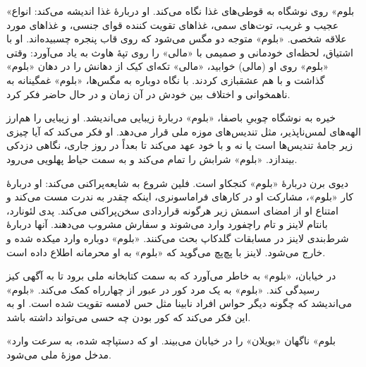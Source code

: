 \documentclass[12pt]{book}
\newcommand{\noun}[1]{«{#1}»}
\begin{document}
    \noun{بلوم} روی نوشگاه به قوطی‌های غذا نگاه می‌کند. او دربارۀ غذا اندیشه می‌کند: انواع عجیب و غریب، توت‌های سمی، غذاهای تقویت کننده قوای جنسی، و غذاهای مورد علاقه شخصی. \noun{بلوم} متوجه دو مگس می‌شود که روی قاب پنجره چسبیده‌اند. او با اشتیاق، لحظه‌ای خودمانی و صمیمی با \noun{مالی} را روی تپۀ هاوث به یاد می‌آورد: وقتی \noun{بلوم} روی او (مالی) خوابید، \noun{مالی} تکه‌ای کیک از دهانش را در دهان \noun{بلوم} گذاشت و با هم عشقبازی کردند. با نگاه دوباره به مگس‌ها، \noun{بلوم} غمگینانه به ناهمخوانی و اختلاف بین خودش در آن زمان و در حال حاضر فکر کرد.

    خیره به نوشگاه چوبیِ باصفا، \noun{بلوم} دربارۀ زیبایی می‌اندیشد. او زیبایی را هم‌ارز الهه‌های لمس‌ناپذیر، مثل تندیس‌های موزه ملی قرار می‌دهد. او فکر می‌کند که آیا چیزی زیر جامۀ تندیس‌ها است یا نه و با خود عهد می‌کند تا بعداً در روز جاری، نگاهی دزدکی بیندازد. \noun{بلوم} شرابش را تمام می‌کند و به سمت حیاط پهلویی می‌رود.

    دیوی برن دربارۀ \noun{بلوم} کنجکاو است. فلین شروع به شایعه‌پراکنی می‌کند: او دربارۀ کار \noun{بلوم}، مشارکت او در کارهای فراماسونری، اینکه چقدر به ندرت مست می‌کند و امتناع او از امضای اسمش زیر هرگونه قراردادی سخن‌پراکنی می‌کند. پدی لئونارد، بانتام لاینز و تام راچفورد وارد می‌شوند و سفارش مشروب می‌دهند. آنها دربارۀ شرط‌بندی لاینز در مسابقات گلدکاپ بحث می‌کنند. \noun{بلوم} دوباره وارد میکده شده و خارج می‌شود. لاینز با پچ‌پچ می‌گوید که \noun{بلوم} به او محرمانه اطلاع داده است.

    در خیابان، \noun{بلوم} به خاطر می‌آورد که به سمت کتابخانه ملی برود تا به آگهی کیز رسیدگی کند. \noun{بلوم} به یک مرد کور در عبور از چهارراه کمک می‌کند. \noun{بلوم} می‌اندیشد که چگونه دیگر حواس افراد نابینا مثل حس لامسه تقویت شده است. او به این فکر می‌کند که کور بودن چه حسی می‌تواند داشته باشد.

    \noun{بلوم} ناگهان \noun{بویلان} را در خیابان می‌بیند. او که دستپاچه شده، به سرعت وارد مدخل موزۀ ملی می‌شود.
\end{document}
